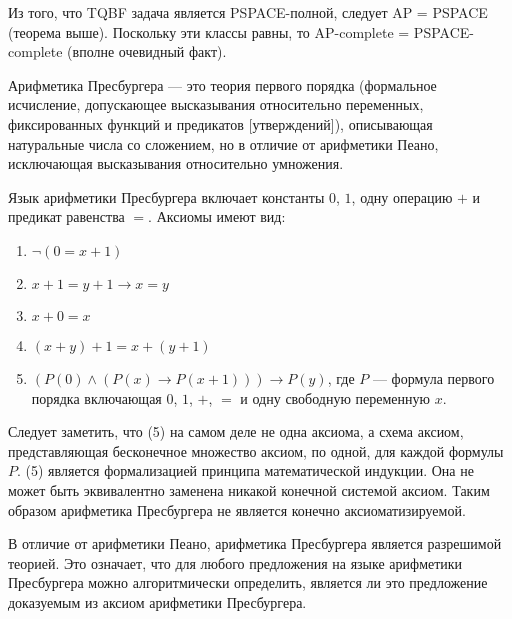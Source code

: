     \begin{Rem}
        Из того, что TQBF задача является PSPACE-полной, следует AP = PSPACE (теорема выше). Поскольку эти классы равны, то AP-complete = PSPACE-complete (вполне очевидный факт).
    \end{Rem}


    
    \begin{Def}
        Арифметика Пресбургера — это теория первого порядка (формальное исчисление, допускающее высказывания относительно переменных, фиксированных функций и предикатов [утверждений]), описывающая натуральные числа со сложением, но в отличие от арифметики Пеано, исключающая высказывания относительно умножения.
    \end{Def}
    
    \begin{Def}
        Язык арифметики Пресбургера включает константы $0$, $1$, одну операцию $+$ и предикат равенства $=$. Аксиомы имеют вид:
        \begin{enumerate}
            \item $\neg (0 = x + 1)$
            \item $x + 1 = y + 1 \rightarrow x = y$
            \item $x + 0 = x$
            \item $(x + y) + 1 = x + (y + 1)$
            \item$ (P(0) \wedge (P(x) \rightarrow P(x + 1))) \rightarrow P(y)$, где $P$ ---  формула первого порядка включающая $0$, $1$, $+$, $=$ и одну свободную переменную $x$.
        \end{enumerate}
        Следует заметить, что (5) на самом деле не одна аксиома, а схема аксиом, представляющая бесконечное множество аксиом, по одной, для каждой формулы $P$. (5) является формализацией принципа математической индукции. Она не может быть эквивалентно заменена никакой конечной системой аксиом. Таким образом арифметика Пресбургера не является конечно аксиоматизируемой.
    \end{Def}
    
    \begin{Rem}
        В отличие от арифметики Пеано, арифметика Пресбургера является разрешимой теорией. Это означает, что для любого предложения на языке арифметики Пресбургера можно алгоритмически определить, является ли это предложение доказуемым из аксиом арифметики Пресбургера.
    \end{Rem}
    
